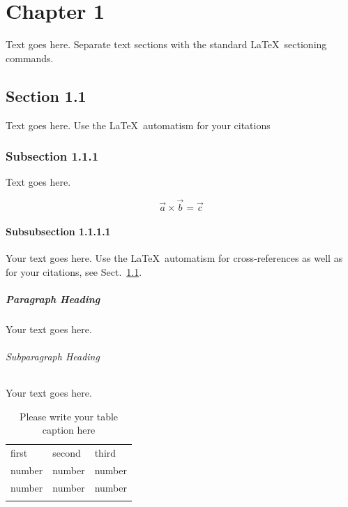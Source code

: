 % 
% 
\chapter{Chapter 1}
\label{intro 1} %

Text goes here. Separate text sections with the standard \LaTeX\
sectioning commands.

\section{Section 1.1}
\label{sec:1.1}
Text goes here. Use the \LaTeX\ automatism for your citations

\subsection{Subsection 1.1.1}
\label{sec:1.2}
Text goes here.

\begin{equation}
\vec{a}\times\vec{b}=\vec{c}
\end{equation}

\subsubsection{Subsubsection 1.1.1.1}
Your text goes here. Use the \LaTeX\ automatism for cross-references as
well as for your citations, see Sect.~\ref{sec:1.1}.

\paragraph{Paragraph Heading} 
Your text goes here.

\subparagraph{Subparagraph Heading}
 Your text goes here.

%
%
\begin{table}
\centering
\caption{Please write your table caption here}
\label{tab:1}       %
%
%
\begin{tabular}{lll}
\hline\noalign{\smallskip}
first & second & third  \\
\noalign{\smallskip}\hline\noalign{\smallskip}
number & number & number \\
number & number & number \\
\noalign{\smallskip}\hline
\end{tabular}
\end{table}

